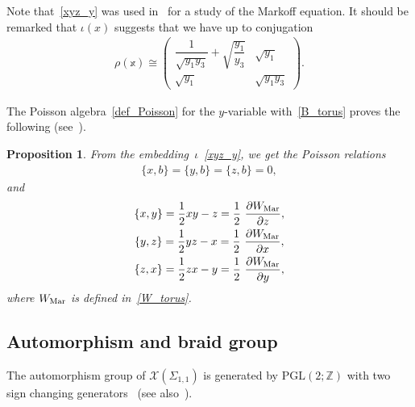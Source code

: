 \documentclass[10pt,a4paper]{amsart}
\numberwithin{equation}{section}
\newtheorem{Proposition}[Theorem]{Proposition}
 { \theoremstyle{definition}
\newtheorem{Definition}[Theorem]{Definition}
\newtheorem{Note}[Theorem]{Note}
\newtheorem{Example}[Theorem]{Example}
\newtheorem{Remark}[Theorem]{Remark} }
\begin{document}
Note that~\eqref{xyz_y} was used in~\cite{FockGonc07b} for a study of the Markoff equation. It should be remarked that $\iota(x)$ suggests that we have up to conjugation
\begin{gather*}
 \rho(\mathbb{x}) \cong \begin{pmatrix}
 \dfrac{1}{\sqrt{y_1 y_3}} + \sqrt{\dfrac{y_1}{y_3}} & \sqrt{y_1} \\
 \sqrt{y_1} & \sqrt{y_1 y_3}
 \end{pmatrix} .
\end{gather*}

The Poisson algebra~\eqref{def_Poisson} for the $y$-variable with~\eqref{B_torus} proves the following (see~\cite{WGold97a}).

\begin{Proposition} \label{prop:Poisson_torus} From the embedding~$\iota$~\eqref{xyz_y}, we get the Poisson relations
 \begin{gather*}
 \{ x ,b\} = \{ y , b\} = \{ z , b\} = 0,
 \end{gather*}
 and
 \begin{gather*}
 \{ x, y\} = \frac{1}{2} x y -z = \frac{1}{2}\ \frac{\partial W_{\text{\rm Mar}}}{\partial z} , \\
 \{ y , z\} = \frac{1}{2} y z -x = \frac{1}{2}\ \frac{\partial W_{\text{\rm Mar}}}{\partial x} , \\
 \{ z , x\} = \frac{1}{2} z x - y = \frac{1}{2}\ \frac{\partial W_{\text{\rm Mar}}}{\partial y} ,
 \end{gather*}
 where $W_{\text{\rm Mar}}$ is defined in~\eqref{W_torus}.
\end{Proposition}

\subsection{Automorphism and braid group}

The automorphism group of $\mathcal{X}(\Sigma_{1,1})$ is generated by $\mathrm{PGL}(2;\mathbb{Z})$ with two sign changing gene\-ra\-tors~\cite{WGold03a, RHorow75a} (see also~\cite{GoldmNeuma05a}).
\end{document}
